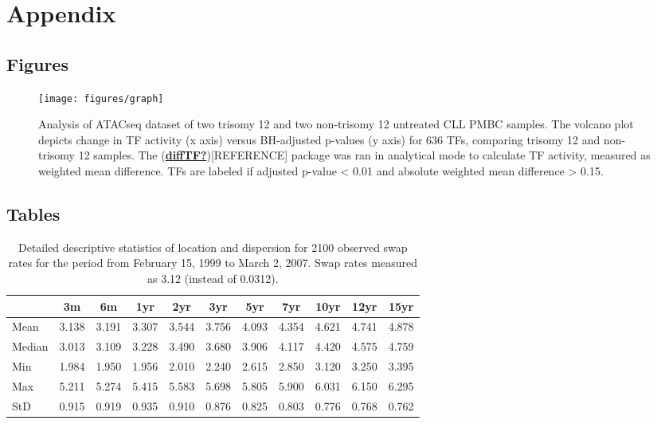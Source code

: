 \documentclass[11pt, a4paper, twosided]{book}
\begin{document}
\newpage

\hypertarget{appendix}{%
\chapter*{Appendix}\label{appendix}}

\hypertarget{figures}{%
\section*{Figures}\label{figures}}


\begin{figure}

{\centering \texttt{[image: figures/graph]} 

}

\caption{Analysis of ATACseq dataset of two trisomy 12 and two non-trisomy 12 untreated CLL PMBC samples. The volcano plot depicts change in TF activity (x axis) versus BH-adjusted p-values (y axis) for 636 TFs, comparing trisomy 12 and non-trisomy 12 samples. The (\protect\hyperlink{ref-diffTF}{\textbf{diffTF?}}){[}REFERENCE{]} package was ran in analytical mode to calculate TF activity, measured as weighted mean difference. TFs are labeled if adjusted p-value \textless{} 0.01 and absolute weighted mean difference \textgreater{} 0.15.}\label{fig:diffTFsmallvolPlot}
\end{figure}
\hypertarget{tables}{%
\section*{Tables}\label{tables}}
\begin{table}[ht]
    \begin{center}
        {\footnotesize
        \begin{tabular}{l|cccccccccc}
        \hline \hline
                        & 3m    & 6m    & 1yr   & 2yr   & 3yr   & 5yr   & 7yr   & 10yr  & 12yr  & 15yr   \\
            \hline
                Mean   & 3.138 & 3.191 & 3.307 & 3.544 & 3.756 & 4.093 & 4.354 & 4.621 & 4.741 & 4.878  \\
                Median & 3.013 & 3.109 & 3.228 & 3.490 & 3.680 & 3.906 & 4.117 & 4.420 & 4.575 & 4.759  \\
                Min    & 1.984 & 1.950 & 1.956 & 2.010 & 2.240 & 2.615 & 2.850 & 3.120 & 3.250 & 3.395  \\
                Max    & 5.211 & 5.274 & 5.415 & 5.583 & 5.698 & 5.805 & 5.900 & 6.031 & 6.150 & 6.295  \\
                StD    & 0.915 & 0.919 & 0.935 & 0.910 & 0.876 & 0.825 & 0.803 & 0.776 & 0.768 & 0.762  \\
            \hline \hline
        \end{tabular}}
    \end{center}
    \caption{Detailed descriptive statistics of location and dispersion for
    2100 observed swap rates for the period from
    February 15, 1999 to March 2, 2007. Swap rates measured as 3.12 (instead of 0.0312).}
    \label{tab:apptable}
\end{table}
\newpage
\end{document}
